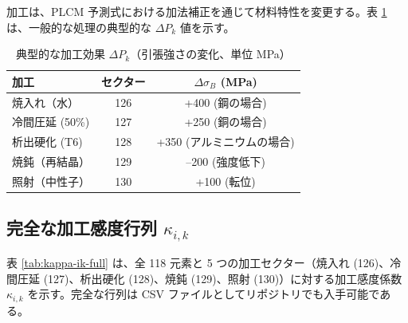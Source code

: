 \documentclass[11pt,a4paper]{article}
\theoremstyle{remark}
\begin{document}
	加工は、PLCM 予測式における加法補正を通じて材料特性を変更する。表 \ref{tab:processing-effects} は、一般的な処理の典型的な \(\Delta P_k\) 値を示す。
	
	\begin{table}[htbp]
		\centering
		\caption{典型的な加工効果 \(\Delta P_k\)（引張強さの変化、単位 MPa）}
		\label{tab:processing-effects}
		\begin{tabular}{lcc}
			\toprule
			加工 & セクター & \(\Delta \sigma_B\) (MPa) \\
			\midrule
			焼入れ（水） & 126 & +400 (鋼の場合) \\
			冷間圧延 (50\%) & 127 & +250 (銅の場合) \\
			析出硬化 (T6) & 128 & +350 (アルミニウムの場合) \\
			焼鈍（再結晶） & 129 & –200 (強度低下) \\
			照射（中性子） & 130 & +100 (転位) \\
			\bottomrule
		\end{tabular}
	\end{table}
	
	\subsection{完全な加工感度行列 \(\kappa_{i,k}\)}
	\label{subsec:full-kappa-ik}
	
	表 \ref{tab:kappa-ik-full} は、全 118 元素と 5 つの加工セクター（焼入れ (126)、冷間圧延 (127)、析出硬化 (128)、焼鈍 (129)、照射 (130)）に対する加工感度係数 \(\kappa_{i,k}\) を示す。完全な行列は CSV ファイルとしてリポジトリでも入手可能である。
	
\end{document}
